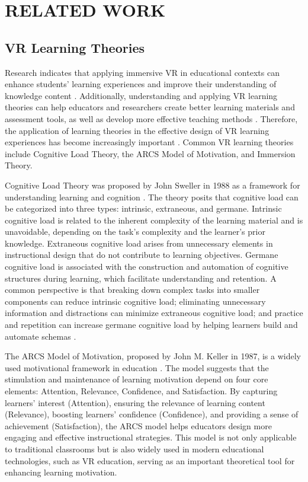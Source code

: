 \section{RELATED WORK}
\subsection{VR Learning Theories}
Research indicates that applying immersive VR in educational contexts can enhance students' learning experiences and improve their understanding of knowledge content \cite{freina2015literature}. Additionally, understanding and applying VR learning theories can help educators and researchers create better learning materials and assessment tools, as well as develop more effective teaching methods \cite{matovu2023immersive}. Therefore, the application of learning theories in the effective design of VR learning experiences has become increasingly important \cite{marougkas2023virtual}. Common VR learning theories include Cognitive Load Theory, the ARCS Model of Motivation, and Immersion Theory.

Cognitive Load Theory was proposed by John Sweller in 1988 as a framework for understanding learning and cognition \cite{sweller1988cognitive}. The theory posits that cognitive load can be categorized into three types: intrinsic, extraneous, and germane. Intrinsic cognitive load is related to the inherent complexity of the learning material and is unavoidable, depending on the task's complexity and the learner's prior knowledge. Extraneous cognitive load arises from unnecessary elements in instructional design that do not contribute to learning objectives. Germane cognitive load is associated with the construction and automation of cognitive structures during learning, which facilitate understanding and retention. A common perspective is that breaking down complex tasks into smaller components can reduce intrinsic cognitive load; eliminating unnecessary information and distractions can minimize extraneous cognitive load; and practice and repetition can increase germane cognitive load by helping learners build and automate schemas \cite{baceviciute2022investigating}.

The ARCS Model of Motivation, proposed by John M. Keller in 1987, is a widely used motivational framework in education \cite{keller1987development}. The model suggests that the stimulation and maintenance of learning motivation depend on four core elements: Attention, Relevance, Confidence, and Satisfaction. By capturing learners' interest (Attention), ensuring the relevance of learning content (Relevance), boosting learners' confidence (Confidence), and providing a sense of achievement (Satisfaction), the ARCS model helps educators design more engaging and effective instructional strategies. This model is not only applicable to traditional classrooms but is also widely used in modern educational technologies, such as VR education, serving as an important theoretical tool for enhancing learning motivation.

